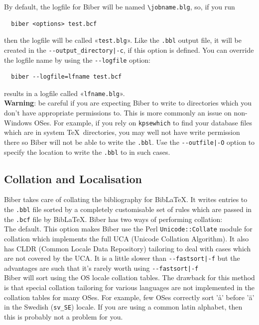 \documentclass{ltxdockit}
\def\biberex#1{\hbox{\hspace{-4em}\texttt{\small \detokenize{#1}}}}
\begin{document}
By default, the logfile for Biber will be named \verb+\jobname.blg+,
so, if you run

\begin{verbatim}
  biber <options> test.bcf
\end{verbatim}

\noindent then the logfile will be called «\verb+test.blg+». Like the
\verb+.bbl+ output file, it will be created in the
\verb+--output_directory|-c+, if this option is defined. You can
override the logfile name by using the \verb+--logfile+ option:

\begin{verbatim}
  biber --logfile=lfname test.bcf
\end{verbatim}

\noindent results in a logfile called «\verb+lfname.blg+».\\

\noindent \textbf{Warning}: be careful if you are expecting Biber to
write to directories which you don't have appropriate permissions to. This
is more commonly an issue on non-Windows OSes. For example, if you rely on
\verb+kpsewhich+ to find your database files which are in system \TeX\
directories, you may well not have write permission there so Biber
will not be able to write the \verb+.bbl+. Use the \verb+--outfile|-O+
option to specify the location to write the \verb+.bbl+ to in such cases.

\subsection{Collation and Localisation}\label{coll}

Biber takes care of collating the bibliography for
Bib\LaTeX. It writes entries to the \verb+.bbl+ file sorted by a
completely customisable set of rules which are passed in the
\verb+.bcf+ file by Bib\LaTeX. Biber has two ways of performing
collation:\\[2ex]

\biberex{--collate|-C}
  \noindent The default. This option makes Biber use the Perl
  \verb+Unicode::Collate+ module for collation which implements the full UCA (Unicode
  Collation Algorithm). It also has CLDR (Common Locale Data
  Repository) tailoring to deal with cases which are not covered by the
  UCA. It is a little slower than \verb+--fastsort|-f+ but the
  advantages are such that it's rarely worth using \verb+--fastsort|-f+\\[1ex]

\biberex{--fastsort|-f}
  \noindent Biber will sort using
  the OS locale collation tables. The drawback for this method is that special
  collation tailoring for various languages are not implemented in the
  collation tables for many OSes. For example, few OSes correctly sort 'å'
  before 'ä' in the Swedish (\verb+sv_SE+) locale. If you are using a
  common latin alphabet, then this is probably not a problem for you.\\[2ex]
\end{document}
